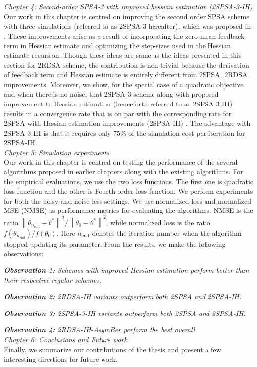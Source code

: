 \documentclass[12pt]{article}
\renewcommand{\l}{\left\|}
\renewcommand{\r}{\right\|}
\begin{document}
 
 
 
 \textit{Chapter 4: Second-order SPSA-3 with improved hessian estimation (2SPSA-3-IH)}\\
 
 
 
Our work in this chapter is centred on improving the second order SPSA scheme with three simulations (referred to as 2SPSA-3 hereafter), which was proposed in  \cite{bhatnagar2015simultaneous}. These improvements arise as a result of incorporating the zero-mean feedback term in Hessian estimate and optimizing the step-sizes used in the Hessian estimate recursion. Though these ideas are same as the ideas presented in this section for 2RDSA scheme, the contribution is non-trivial because the derivation of feedback term and Hessian estimate is entirely different from 2SPSA, 2RDSA improvements. Moreover, we show, for the special case of a quadratic objective and when there is no noise, that 2SPSA-3 scheme along with proposed improvement to Hessian estimation (henceforth referred to as 2SPSA-3-IH) results in a convergence rate that is on par with the corresponding rate for 2SPSA with Hessian estimation improvements (2SPSA-IH) \cite{spall-jacobian}. The advantage with 2SPSA-3-IH is that it requires only 75\% of the simulation cost per-iteration for 2SPSA-IH. \\


\textit{Chapter 5: Simulation experiments}\\

Our work in this chapter is centred on testing the performance of the several algorithms proposed in earlier chapters along with the existing algorithms. For the empirical evaluations, we use the two loss functions. The first one is quadratic  loss  function and the other is Fourth-order loss function. We perform experiments for both the noisy and noise-less settings. We use normalized loss and normalized MSE (NMSE) as performance metrics for evaluating the algorithms. NMSE is the ratio $\l \theta_{n_\text{end}} - \theta^* \r^2 / \l \theta_0 - \theta^*\r^2$, while normalized loss is the ratio $f(\theta_{n_\text{end}})/f(\theta_0)$. Here $n_\text{end}$ denotes the iteration number when the algorithm stopped updating its parameter. From the results, we make the following observations:
 
 \textit{\textbf{Observation 1:} Schemes with improved Hessian estimation perform better than their respective regular schemes.}
 
\textit{\textbf{Observation 2:} 2RDSA-IH variants outperform both 2SPSA and 2SPSA-IH.}

\textit{\textbf{Observation 3:} 2SPSA-3-IH variants outperform both 2SPSA and 2SPSA-IH.}

\textit{\textbf{Observation 4:} 2RDSA-IH-AsymBer perform the best overall.}\\
 
 \textit{Chapter 6: Conclusions and Future work}\\
 
Finally, we summarize our contributions of the thesis and present a few interesting directions for future work.

 
 


 


\end{document}
